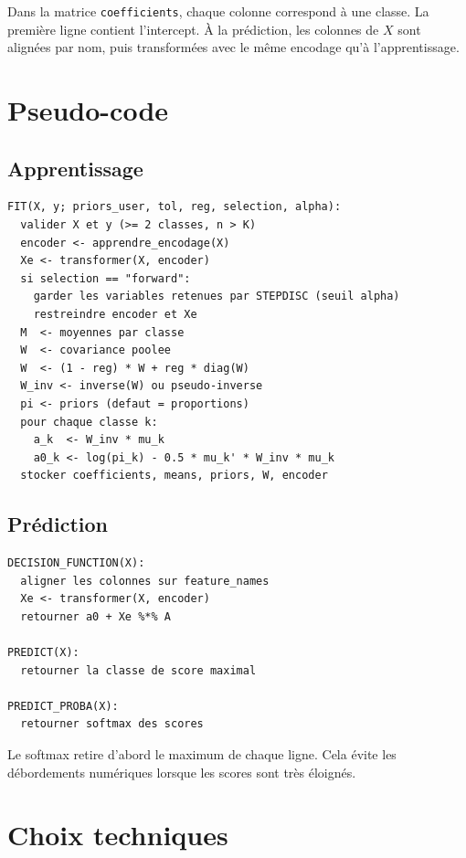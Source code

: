 \documentclass[11pt,a4paper]{article}
\begin{document}
Dans la matrice \texttt{coefficients}, chaque colonne correspond \`a une
classe. La premi\`ere ligne contient l'intercept. \`A la pr\'ediction, les
colonnes de \(X\) sont align\'ees par nom, puis transform\'ees avec le m\^eme
encodage qu'\`a l'apprentissage.

\section{Pseudo-code}

\subsection{Apprentissage}

\begin{lstlisting}
FIT(X, y; priors_user, tol, reg, selection, alpha):
  valider X et y (>= 2 classes, n > K)
  encoder <- apprendre_encodage(X)
  Xe <- transformer(X, encoder)
  si selection == "forward":
    garder les variables retenues par STEPDISC (seuil alpha)
    restreindre encoder et Xe
  M  <- moyennes par classe
  W  <- covariance poolee
  W  <- (1 - reg) * W + reg * diag(W)
  W_inv <- inverse(W) ou pseudo-inverse
  pi <- priors (defaut = proportions)
  pour chaque classe k:
    a_k  <- W_inv * mu_k
    a0_k <- log(pi_k) - 0.5 * mu_k' * W_inv * mu_k
  stocker coefficients, means, priors, W, encoder
\end{lstlisting}

\subsection{Pr\'ediction}

\begin{lstlisting}
DECISION_FUNCTION(X):
  aligner les colonnes sur feature_names
  Xe <- transformer(X, encoder)
  retourner a0 + Xe %*% A

PREDICT(X):
  retourner la classe de score maximal

PREDICT_PROBA(X):
  retourner softmax des scores
\end{lstlisting}

Le softmax retire d'abord le maximum de chaque ligne. Cela \'evite les
d\'ebordements num\'eriques lorsque les scores sont tr\`es \'eloign\'es.

\section{Choix techniques}
\end{document}
